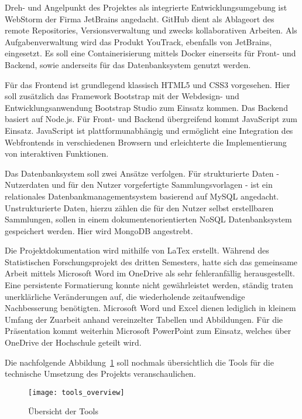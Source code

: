 Dreh- und Angelpunkt des Projektes als integrierte Entwicklungsumgebung ist WebStorm der Firma JetBrains angedacht.
GitHub dient als Ablageort des remote Repositories, Versionsverwaltung und zwecks kollaborativen Arbeiten.
Als Aufgabenverwaltung wird das Produkt YouTrack, ebenfalls von JetBrains, eingesetzt.
Es soll eine Containerisierung mittels Docker einerseits für Front- und Backend, sowie anderseits für das Datenbanksystem genutzt werden.

Für das Frontend ist grundlegend klassisch HTML5 und CSS3 vorgesehen.
Hier soll zusätzlich das Framework Bootstrap mit der Webdesign- und Entwicklungsanwendung Bootstrap Studio zum Einsatz kommen.
Das Backend basiert auf Node.js.
Für Front- und Backend übergreifend kommt JavaScript zum Einsatz.
JavaScript ist plattformunabhängig und ermöglicht eine Integration des Webfrontends in verschiedenen Browsern und erleichterte die Implementierung von interaktiven Funktionen.

Das Datenbanksystem soll zwei Ansätze verfolgen.
Für strukturierte Daten - Nutzerdaten und für den Nutzer vorgefertigte Sammlungsvorlagen - ist ein relationales Datenbankmanagementsystem basierend auf MySQL angedacht.
Unstrukturierte Daten, hierzu zählen die für den Nutzer selbst erstellbaren Sammlungen, sollen in einem dokumentenorientierten NoSQL Datenbanksystem gespeichert werden.
Hier wird MongoDB angestrebt.

Die Projektdokumentation wird mithilfe von LaTex erstellt.
Während des Statistischen Forschungsprojekt des dritten Semesters, hatte sich das gemeinsame Arbeit mittels Microsoft Word im OneDrive als sehr fehleranfällig herausgestellt.
Eine persistente Formatierung konnte nicht gewährleistet werden, ständig traten unerklärliche Veränderungen auf, die wiederholende zeitaufwendige Nachbesserung benötigten.
Microsoft Word und Excel dienen lediglich in kleinem Umfang der Zuarbeit anhand vereinzelter Tabellen und Abbildungen.
Für die Präsentation kommt weiterhin Microsoft PowerPoint zum Einsatz, welches über OneDrive der Hochschule geteilt wird.

Die nachfolgende Abbildung~\ref{fig:uebersicht-tools} soll nochmals übersichtlich die Tools für die technische Umsetzung des Projekts veranschaulichen.

\begin{figure}[H]
    \centering
    \texttt{[image: tools\_overview]}
    \caption{Übersicht der Tools}\label{fig:uebersicht-tools}
\end{figure}
